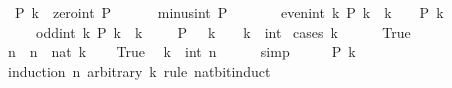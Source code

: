 \begin{isabellebody}
\ \ {\isachardoublequoteopen}P\ k{\isachardoublequoteclose}\ \ zero{\isacharunderscore}{\kern0pt}int{\isacharcolon}{\kern0pt}\ {\isachardoublequoteopen}P\ {}{\isachardoublequoteclose}\isanewline
\ \ \ \ \ minus{\isacharunderscore}{\kern0pt}int{\isacharcolon}{\kern0pt}\ {\isachardoublequoteopen}P\ {\isacharparenleft}{\kern0pt}{\isacharminus}{\kern0pt}\ {}{\isacharparenright}{\kern0pt}{\isachardoublequoteclose}\isanewline
\ \ \ \ \ even{\isacharunderscore}{\kern0pt}int{\isacharcolon}{\kern0pt}\ {\isachardoublequoteopen}{\isasymAnd}k{\isachardot}{\kern0pt}\ P\ k\ {\isasymLongrightarrow}\ k\ {\isasymnoteq}\ {}\ {\isasymLongrightarrow}\ P\ {\isacharparenleft}{\kern0pt}k\ {\isacharasterisk}{\kern0pt}\ {}{\isacharparenright}{\kern0pt}{\isachardoublequoteclose}\isanewline
\ \ \ \ \ odd{\isacharunderscore}{\kern0pt}int{\isacharcolon}{\kern0pt}\ {\isachardoublequoteopen}{\isasymAnd}k{\isachardot}{\kern0pt}\ P\ k\ {\isasymLongrightarrow}\ k\ {\isasymnoteq}\ {\isacharminus}{\kern0pt}\ {}\ {\isasymLongrightarrow}\ P\ {\isacharparenleft}{\kern0pt}{}\ {\isacharplus}{\kern0pt}\ {\isacharparenleft}{\kern0pt}k\ {\isacharasterisk}{\kern0pt}\ {}{\isacharparenright}{\kern0pt}{\isacharparenright}{\kern0pt}{\isachardoublequoteclose}\ \ k\ {\isacharcolon}{\kern0pt}{\isacharcolon}{\kern0pt}\ int\isanewline
%
\isadelimproof
%
\endisadelimproof
%
\isatagproof
{}\isamarkupfalse%
\ {\isacharparenleft}{\kern0pt}cases\ {\isachardoublequoteopen}k\ {\isasymge}\ {}{\isachardoublequoteclose}{\isacharparenright}{\kern0pt}\isanewline
\ \ \isamarkupfalse%
\ True\isanewline
\ \ \isamarkupfalse%
\ n\ \ {\isachardoublequoteopen}n\ {\isacharequal}{\kern0pt}\ nat\ k{\isachardoublequoteclose}\isanewline
\ \ \isamarkupfalse%
\ True\ \isamarkupfalse%
\ {\isachardoublequoteopen}k\ {\isacharequal}{\kern0pt}\ int\ n{\isachardoublequoteclose}\isanewline
\ \ \ \ \isamarkupfalse%
\ simp\isanewline
\ \ \isamarkupfalse%
\ \isamarkupfalse%
\ {\isachardoublequoteopen}P\ k{\isachardoublequoteclose}\isanewline
\ \ \isamarkupfalse%
\ {\isacharparenleft}{\kern0pt}induction\ n\ arbitrary{\isacharcolon}{\kern0pt}\ k\ rule{\isacharcolon}{\kern0pt}\ nat{\isacharunderscore}{\kern0pt}bit{\isacharunderscore}{\kern0pt}induct{\isacharparenright}{\kern0pt}\isanewline
\ \ \ \ \isamarkupfalse%

\end{isabellebody}
